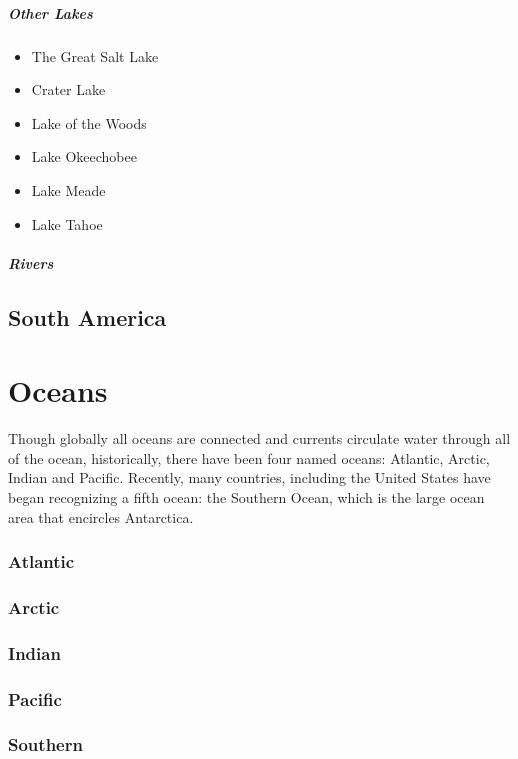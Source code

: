 				\subparagraph{Other Lakes}
				\begin{itemize}
					
					\item{The Great Salt Lake}
					\item{Crater Lake}
					\item{Lake of the Woods}
					\item{Lake Okeechobee}
					\item{Lake Meade}
					\item{Lake Tahoe}
				\end{itemize}
				\subparagraph{Rivers}
		
			
	\subsection{South America}


	\section{Oceans}
		Though globally all oceans are connected and currents circulate water through all of the ocean, historically, there have been four named oceans: Atlantic, Arctic, Indian and Pacific. Recently, many countries, including the United States have began recognizing a fifth ocean: the Southern Ocean, which is the large ocean area that encircles Antarctica.  
		\subsubsection{Atlantic}
		\subsubsection{Arctic}
		\subsubsection{Indian}
		\subsubsection{Pacific}
		\subsubsection{Southern}
		
		
